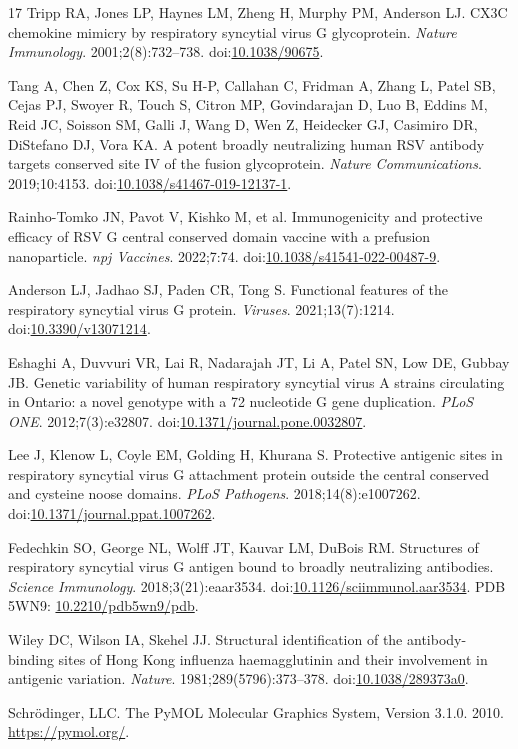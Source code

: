 \documentclass[11pt]{article}
\begin{document}
\begin{thebibliography}{17}
Tripp RA, Jones LP, Haynes LM, Zheng H, Murphy PM, Anderson LJ. CX3C chemokine mimicry by respiratory syncytial virus G glycoprotein. \emph{Nature Immunology}. 2001;2(8):732--738. doi:\href{https://doi.org/10.1038/90675}{10.1038/90675}.

Tang A, Chen Z, Cox KS, Su H-P, Callahan C, Fridman A, Zhang L, Patel SB, Cejas PJ, Swoyer R, Touch S, Citron MP, Govindarajan D, Luo B, Eddins M, Reid JC, Soisson SM, Galli J, Wang D, Wen Z, Heidecker GJ, Casimiro DR, DiStefano DJ, Vora KA. A potent broadly neutralizing human RSV antibody targets conserved site IV of the fusion glycoprotein. \emph{Nature Communications}. 2019;10:4153. doi:\href{https://doi.org/10.1038/s41467-019-12137-1}{10.1038/s41467-019-12137-1}.

Rainho-Tomko JN, Pavot V, Kishko M, et al. Immunogenicity and protective efficacy of RSV G central conserved domain vaccine with a prefusion nanoparticle. \emph{npj Vaccines}. 2022;7:74. doi:\href{https://doi.org/10.1038/s41541-022-00487-9}{10.1038/s41541-022-00487-9}.

Anderson LJ, Jadhao SJ, Paden CR, Tong S. Functional features of the respiratory syncytial virus G protein. \emph{Viruses}. 2021;13(7):1214. doi:\href{https://doi.org/10.3390/v13071214}{10.3390/v13071214}.

Eshaghi A, Duvvuri VR, Lai R, Nadarajah JT, Li A, Patel SN, Low DE, Gubbay JB. Genetic variability of human respiratory syncytial virus A strains circulating in Ontario: a novel genotype with a 72 nucleotide G gene duplication. \emph{PLoS ONE}. 2012;7(3):e32807. doi:\href{https://doi.org/10.1371/journal.pone.0032807}{10.1371/journal.pone.0032807}.

Lee J, Klenow L, Coyle EM, Golding H, Khurana S. Protective antigenic sites in respiratory syncytial virus G attachment protein outside the central conserved and cysteine noose domains. \emph{PLoS Pathogens}. 2018;14(8):e1007262. doi:\href{https://doi.org/10.1371/journal.ppat.1007262}{10.1371/journal.ppat.1007262}.

Fedechkin SO, George NL, Wolff JT, Kauvar LM, DuBois RM. Structures of respiratory syncytial virus G antigen bound to broadly neutralizing antibodies. \emph{Science Immunology}. 2018;3(21):eaar3534. doi:\href{https://doi.org/10.1126/sciimmunol.aar3534}{10.1126/sciimmunol.aar3534}. PDB 5WN9: \href{https://doi.org/10.2210/pdb5wn9/pdb}{10.2210/pdb5wn9/pdb}.

Wiley DC, Wilson IA, Skehel JJ. Structural identification of the antibody-binding sites of Hong Kong influenza haemagglutinin and their involvement in antigenic variation. \emph{Nature}. 1981;289(5796):373--378. doi:\href{https://doi.org/10.1038/289373a0}{10.1038/289373a0}.

Schr\"odinger, LLC. The PyMOL Molecular Graphics System, Version 3.1.0. 2010. \url{https://pymol.org/}.

\end{thebibliography}
\end{document}
